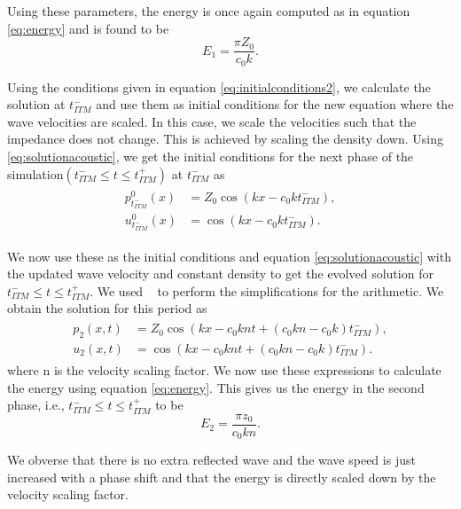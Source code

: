 Using these parameters, the energy is once again computed as in equation \ref{eq:energy} and is found to be
\begin{equation}
    E_1 = \frac{\pi Z_0}{c_0 k} .
\end{equation}

Using the conditions given in equation \ref{eq:initialconditions2}, we calculate the solution at $t_{ITM}^-$ and use them as initial conditions for the new equation where the wave velocities are scaled.
In this case, we scale the velocities such that the impedance does not change. This is achieved by scaling the density down. Using \ref{eq:solutionacoustic}, we get the initial conditions for the next phase of the simulation$\left(t_{ITM}^- \leq t \leq t_{ITM}^+ \right)$ at $t_{ITM}^-$ as
\begin{align}
    \begin{split}
        p^0_{t_{ITM}^-}\left(x\right) &= Z_0 \cos\left(kx - c_0kt_{ITM}^-\right), \\
        u^0_{t_{ITM}^-}\left(x\right) &= \cos\left(kx - c_0kt_{ITM}^-\right) .
    \end{split}
\end{align}

We now use these as the initial conditions and equation \ref{eq:solutionacoustic} with the updated wave velocity and constant density to get the evolved solution for $t_{ITM}^- \leq t \leq t_{ITM}^+ $. 
We used ~\parencite{sagemath} to perform the simplifications for the arithmetic. We obtain the solution for this period as
\begin{align}
    \begin{split}
        p_{2}\left(x, t\right) &= Z_{0} \cos\left(kx -c_{0} k n t + {\left(c_{0} k n - c_{0} k\right)} \mathit{t_{ITM}^-}\right), \\
        u_{2}\left(x, t\right) &= \cos\left(kx -c_{0} k n t + {\left(c_{0} k n - c_{0} k\right)} \mathit{t_{ITM}^-} \right) .
    \end{split}
\end{align}
where n is the velocity scaling factor. We now use these expressions to calculate the energy using equation \ref{eq:energy}. This gives us the energy in the second phase, i.e., $t_{ITM}^- \leq t \leq t_{ITM}^+ $ to be
\begin{equation}
    E_2 = \frac{\pi z_{0}}{c_{0} k n} .
\end{equation}

We obverse that there is no extra reflected wave and the wave speed is just increased with a phase shift and that the energy is directly scaled down by the velocity scaling factor.

